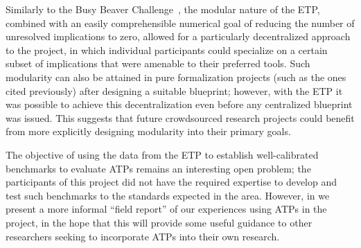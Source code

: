 Similarly to the Busy Beaver Challenge~\cite{bbchallenge_bb5}, the modular nature of the ETP, combined with an easily comprehensible numerical goal of reducing the number of unresolved implications to zero, allowed for a particularly decentralized approach to the project, in which individual participants could specialize on a certain subset of implications that were amenable to their preferred tools.  Such modularity can also be attained in pure formalization projects (such as the ones cited previously) after designing a suitable blueprint; however, with the ETP it was possible to achieve this decentralization even before any centralized blueprint was issued. This suggests that future crowdsourced research projects could benefit from more explicitly designing modularity into their primary goals.

The objective of using the data from the ETP to establish well-calibrated benchmarks to evaluate ATPs remains an interesting open problem; the participants of this project did not have the required expertise to develop and test such benchmarks to the standards expected in the area.  However, in  we present a more informal ``field report'' of our experiences using ATPs in the project, in the hope that this will provide some useful guidance to other researchers seeking to incorporate ATPs into their own research.

